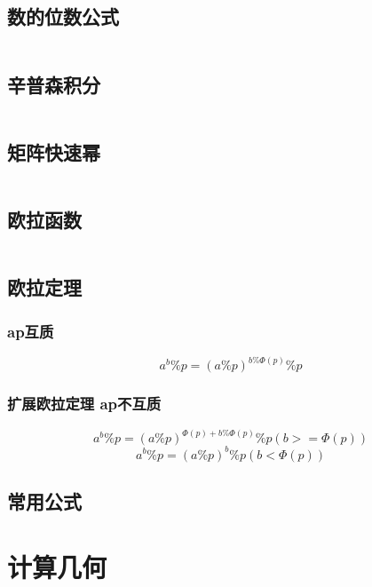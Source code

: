 \documentclass[a4paper,11pt]{article}
\begin{document}
\subsection{数的位数公式}
\inputminted[breaklines]{c++}{数论/数的位数公式.cpp} 

\subsection{辛普森积分}
\inputminted[breaklines]{c++}{数论/辛普森积分.cpp} 

\subsection{矩阵快速幂} 
\inputminted[breaklines]{c++}{数论/矩阵快速幂.cpp} 

\subsection{欧拉函数} 
\inputminted[breaklines]{c++}{数论/欧拉函数.cpp} 

\subsection{欧拉定理} 
\subsubsection{ap互质}
\begin{equation}
a ^ b \% p = (a \% p) ^ {b \% \Phi(p)}  \% p
\end{equation}

\subsubsection{扩展欧拉定理 ap不互质}
\begin{equation}
a ^ b \% p = (a \% p ) ^ {\Phi(p) + b \% \Phi(p)} \% p (b >= \Phi(p))
\end{equation}
\begin{equation}
a ^ b \% p = (a \% p ) ^ b \% p (b < \Phi(p))
\end{equation}

\subsection{常用公式} 


\section{计算几何}
\end{document}
